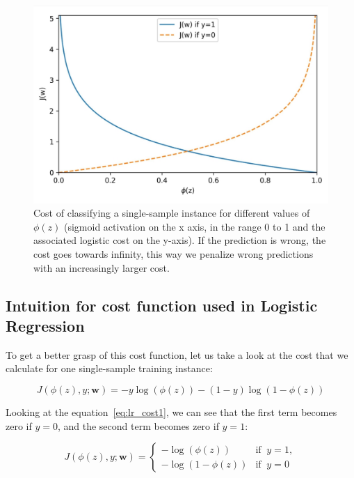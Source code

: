 \documentclass[11pt]{article}
\newcommand{\vect}[1]{\boldsymbol{#1}}
\begin{document}
    \begin{figure}[hbt!]
        \centering
        \includegraphics[width=1\linewidth,trim=1 1 1 1,clip]{img/lr_cost.png}
        \caption{Cost of classifying a single-sample instance for different values of $\phi(z)$ (sigmoid activation on the x axis, in the range 0 to 1 and the associated logistic cost on the y-axis).
        If the prediction is wrong, the cost goes towards infinity, this way we penalize wrong predictions with an increasingly larger cost.}
        \label{fig:lr_cost}
    \end{figure}

    \subsection{Intuition for cost function used in Logistic Regression} \label{subsec:lr_cost_intu}

    To get a better grasp of this cost function, let us take a look at the cost that we calculate for one single-sample training instance:

    \begin{equation}
        \label{eq:lr_cost1}
        J( \phi(z), y; \vect{w}) =
        - y \log \left( \phi(z) \right) - (1 - y) \log (1 - \phi(z) )
    \end{equation}

    Looking at the equation~\ref{eq:lr_cost1}, we can see that the first term becomes zero if $y=0$, and the second term becomes zero if $y=1$:

    \begin{equation}
        J( \phi(z), y; \vect{w} ) =
        \begin{cases}
            - \log ( \phi (z) ) & {\text{if }}\ y = 1, \\
            - \log ( 1 - \phi (z) ) & {\text{if }}\ y = 0
        \end{cases}
    \end{equation}
\end{document}
